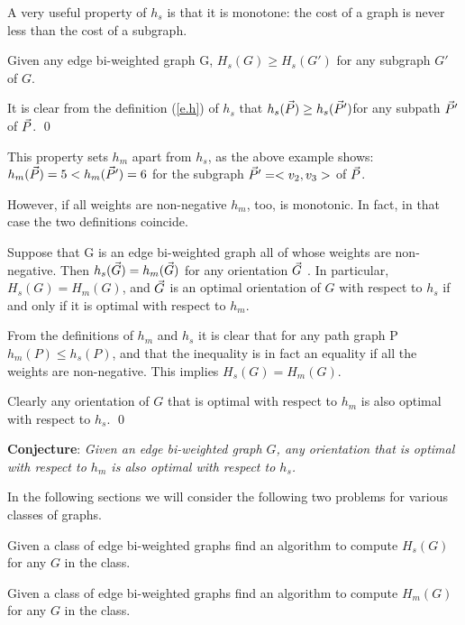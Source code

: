 A very useful property of $h_s$ is that it is monotone: the cost of a graph is never less than the cost of a subgraph.
\begin{lemma}\label{l.sprop}
	Given any edge bi-weighted graph G,
	$H_{s}(G)\geq  H_{s}(G')$ for any subgraph $G'$ of $G$. 
\end{lemma}

It is clear from the definition (\ref{e.h}) of $h_s$ that $h_s(\vec{P})\geq h_s(\vec{P} ')$for any subpath 
$\vec{P} '$ of $\vec{P}$.  
\qed

This property sets $h_m$ apart from $h_s$,  as the above example shows:
$h_{m}(\vec{P})=5 <  h_{m}(\vec{P}')=6$ for the subgraph $\vec{P} '=<v_2,v_3>$ of $\vec{P}$.

However, if all weights are non-negative $h_m$, too, is monotonic. In fact, in that case the two definitions coincide.

\begin{lemma}
	Suppose that G is an edge bi-weighted graph  all of whose weights are non-negative.
	Then $h_{s}( \vec{G} )= h_{m}( \vec{G} )$ for any orientation $\vec{G}$
.
	In particular,  $H_{s}(G)= H_{m}(G)$,  and 
	$\vec{G}$ is an optimal orientation of $G$ with respect to $h_{s}$
	if and only if it is optimal with respect to $ h_{m} $.
\end{lemma}
From the definitions of $h_m$ and $h_s$ it is clear that for any path graph P  $h_{m}(P)\leq  h_{s}(P)$, and that the inequality is in fact an equality if all the weights 
are non-negative. This implies $H_{s}(G)= H_{m}(G)$.

Clearly any orientation of $G$ that is optimal with respect to $h_m$ is also 
optimal with respect to $h_s$. 
\qed

\bigskip
{\bf Conjecture}:
\textit{Given an edge bi-weighted graph $G$, any orientation that is optimal with 
	respect to $h_{m}$ is also optimal with respect to $h_{s} $.}

\bigskip
In the following sections we will consider the following two problems
for various classes of graphs.

\begin{problem}[
	HS]
	Given a class of edge bi-weighted graphs find an algorithm to compute
	$H_s(G) $
	for any $G$
	in the class.
\end{problem}

\begin{problem}[
	HM]
	Given a class of edge bi-weighted graphs find an algorithm to compute $H_m(G) $
	for any $G$
	in the class.
\end{problem}
